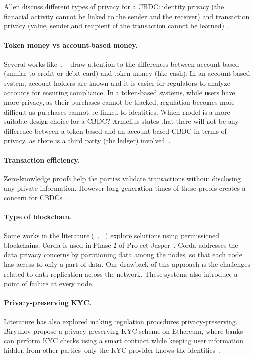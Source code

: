 \documentclass[runningheads]{llncs}
\begin{document}
Allen \etal discuss different types of privacy for a CBDC: identity privacy (the fianacial activity cannot be linked to the sender and the receiver) and transaction privacy (value, sender,and recipient of the transaction cannot be learned)~\cite{ACEF20}.

\paragraph{Token money vs account-based money.} Several works like~\cite{ACH21}, ~\cite{TB21} draw attention to the differences between account-based (similar to credit or debit card) and token money (like cash). In an account-based system, account holders are known and it is easier for regulators to analyze accounts for ensuring compliance. In a token-based systems, while users have more privacy,  as their purchases cannot be tracked, regulation becomes more difficult as purchases cannot be linked to identities. Which model is a more suitable design choice for a CBDC? Armelius \etal states that there will not be any difference between a token-based and an account-based CBDC in terms of privacy, as there is a third party (the ledger) involved~\cite{ACCH21}.

\paragraph{Transaction efficiency.} Zero-knowledge proofs help the parties validate transactions without disclosing any private information. However long generation times of these proofs creates a concern for CBDCs~\cite{ACEF20}.

\paragraph{Type of blockchain.} Some works in the literature (~\cite{WKCC18}, ~\cite{VPLP21}) explore solutions using  permissioned blockchains. Corda is used in Phase 2 of Project Jasper~\cite{CGR+17}. Corda addresses the data privacy concerns by partitioning data among the nodes, so that each node has access to only a part of data. One drawback of this approach is the challenges related to data replication across the network. These systems also introduce a point of failure at every node.

\paragraph{Privacy-preserving KYC.} Literature has also explored making regulation procedures privacy-preserving. Biryukov \etal propose a privacy-preserving KYC scheme on Ethereum, where banks can perform KYC checks using a smart contract while keeping user information hidden from other parties--only the KYC provider knows the identities~\cite{BKT18}.
\end{document}
